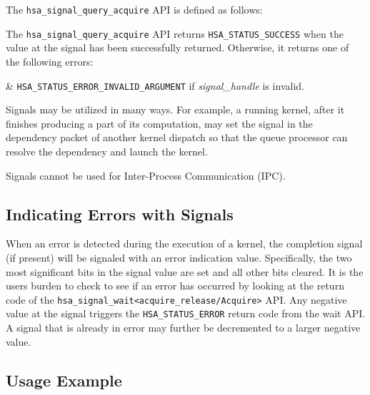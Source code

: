 The \texttt{hsa\_signal\_query\_acquire} API is defined as follows:

 

The \texttt{hsa\_signal\_query\_acquire} API returns
\texttt{HSA\_STATUS\_SUCCESS} when the value at the signal has been
successfully returned. Otherwise, it returns one of the following
errors:

\begin{easylist}
& \texttt{HSA\_STATUS\_ERROR\_INVALID\_ARGUMENT} if {\itshape
signal\_handle} is invalid.
\end{easylist}

Signals may be utilized in many ways. For example, a running kernel,
after it finishes producing a part of its computation, may set the
signal in the dependency packet of another kernel dispatch so that
the queue processor can resolve the dependency and launch the kernel.

Signals cannot be used for Inter-Process Communication (IPC).

\hypertarget{signal_error}{} \subsection{ Indicating Errors with
Signals} \label{signal_error}
When an error is detected during the execution of a kernel, the
completion signal (if present) will be signaled with an error
indication value.  Specifically, the two most significant bits in
the signal value are set and all other bits cleared. It is the users
burden to check to see if an error has occurred by looking at the
return code of the
\texttt{hsa\_signal\_wait<acquire\_release/Acquire>} API. Any
negative value at the signal triggers the
\texttt{HSA\_STATUS\_ERROR} return code from the wait API. A signal
that is already in error may further be decremented to a larger
negative value. 

\hypertarget{signal_example}{} \subsection{Usage Example}
\label{signal_example}
